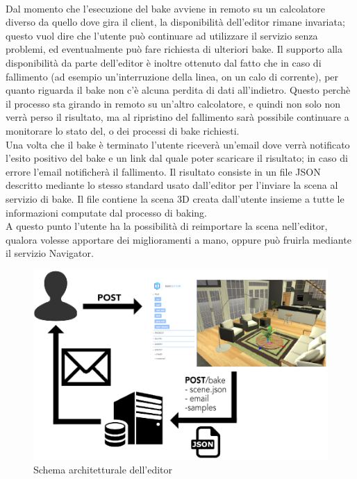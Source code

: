 \\
Dal momento che l’esecuzione del bake avviene in remoto su un calcolatore diverso da quello dove gira il client, la disponibilità dell’editor rimane invariata; questo vuol dire che l’utente può continuare ad utilizzare il servizio senza problemi, ed eventualmente può fare richiesta di ulteriori bake. Il supporto alla disponibilità da parte dell’editor è inoltre ottenuto dal fatto che in caso di fallimento (ad esempio un’interruzione della linea, on un calo di corrente), per quanto riguarda il bake non c’è alcuna perdita di dati all’indietro. Questo perchè il processo sta girando in remoto su un’altro calcolatore, e quindi non solo non verrà perso il risultato, ma al ripristino del fallimento sarà possibile continuare a monitorare lo stato del, o dei processi di bake richiesti.
\\
Una volta che il bake è terminato l’utente riceverà un’email dove verrà notificato l’esito positivo del bake e un link dal quale poter scaricare il risultato; in caso di errore l’email notificherà il fallimento. Il risultato consiste in un file JSON descritto mediante lo stesso standard usato dall’editor per l’inviare la scena al servizio di bake. Il file contiene la scena 3D creata dall’utente insieme a tutte le informazioni computate dal processo di baking.
\\
A questo punto l’utente ha la possibilità di reimportare la scena nell’editor, qualora volesse apportare dei miglioramenti a mano, oppure può fruirla mediante il servizio Navigator.
\\
\begin{figure}[htb]
 \centering
 \includegraphics[width=0.8\linewidth]{images/chapter_architettura_sistema/as_editor.png}\hfill
 \caption[Schema architetturale editor]{Schema architetturale dell'editor}
 \label{fig:as_editor}
\end{figure}

